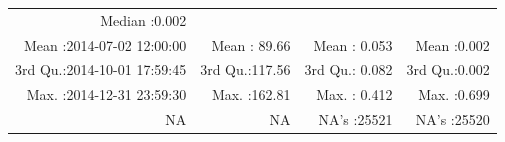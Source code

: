 \documentclass[
  10pt,
  a4paper,oneside]{article}
\begin{document}
\begin{longtable}[]{@{}rrrr@{}}
\begin{minipage}[t]{0.19\columnwidth}
Median :0.002\strut
\end{minipage}\tabularnewline
\begin{minipage}[t]{0.33\columnwidth}\raggedleft
Mean :2014-07-02 12:00:00\strut
\end{minipage} & \begin{minipage}[t]{0.19\columnwidth}\raggedleft
Mean : 89.66\strut
\end{minipage} & \begin{minipage}[t]{0.19\columnwidth}\raggedleft
Mean : 0.053\strut
\end{minipage} & \begin{minipage}[t]{0.19\columnwidth}\raggedleft
Mean :0.002\strut
\end{minipage}\tabularnewline
\begin{minipage}[t]{0.33\columnwidth}\raggedleft
3rd Qu.:2014-10-01 17:59:45\strut
\end{minipage} & \begin{minipage}[t]{0.19\columnwidth}\raggedleft
3rd Qu.:117.56\strut
\end{minipage} & \begin{minipage}[t]{0.19\columnwidth}\raggedleft
3rd Qu.: 0.082\strut
\end{minipage} & \begin{minipage}[t]{0.19\columnwidth}\raggedleft
3rd Qu.:0.002\strut
\end{minipage}\tabularnewline
\begin{minipage}[t]{0.33\columnwidth}\raggedleft
Max. :2014-12-31 23:59:30\strut
\end{minipage} & \begin{minipage}[t]{0.19\columnwidth}\raggedleft
Max. :162.81\strut
\end{minipage} & \begin{minipage}[t]{0.19\columnwidth}\raggedleft
Max. : 0.412\strut
\end{minipage} & \begin{minipage}[t]{0.19\columnwidth}\raggedleft
Max. :0.699\strut
\end{minipage}\tabularnewline
\begin{minipage}[t]{0.33\columnwidth}\raggedleft
NA\strut
\end{minipage} & \begin{minipage}[t]{0.19\columnwidth}\raggedleft
NA\strut
\end{minipage} & \begin{minipage}[t]{0.19\columnwidth}\raggedleft
NA's :25521\strut
\end{minipage} & \begin{minipage}[t]{0.19\columnwidth}\raggedleft
NA's :25520\strut
\end{minipage}\tabularnewline
\bottomrule
\end{longtable}
\end{document}
